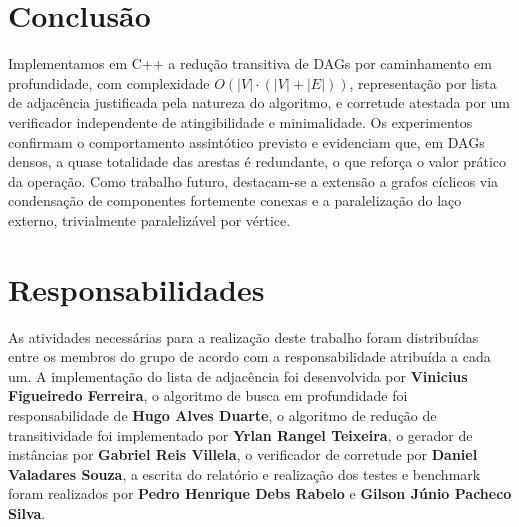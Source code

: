 \documentclass{sbc2023}%
\begin{document}
\section{Conclusão}
\label{sec:conclusao}

Implementamos em C++ a redução transitiva de DAGs por caminhamento em profundidade, com complexidade $O(|V|\cdot(|V|+|E|))$, representação por lista de adjacência justificada pela natureza do algoritmo, e corretude atestada por um verificador independente de atingibilidade e minimalidade. Os experimentos confirmam o comportamento assintótico previsto e evidenciam que, em DAGs densos, a quase totalidade das arestas é redundante, o que reforça o valor prático da operação. Como trabalho futuro, destacam-se a extensão a grafos cíclicos via condensação de componentes fortemente conexas e a paralelização do laço externo, trivialmente paralelizável por vértice.

\section{Responsabilidades}
\label{sec:resp}

As atividades necessárias para a realização deste trabalho foram distribuídas entre os membros do grupo de acordo com a responsabilidade atribuída a cada um. A implementação do lista de adjacência foi desenvolvida por \textbf{Vinicius Figueiredo Ferreira}, o algoritmo de busca em profundidade foi responsabilidade de \textbf{Hugo Alves Duarte}, o algoritmo de redução de transitividade foi implementado por \textbf{Yrlan Rangel Teixeira}, o gerador de instâncias por \textbf{Gabriel Reis Villela}, o verificador de corretude por \textbf{Daniel Valadares Souza}, a escrita do relatório e realização dos testes e benchmark foram realizados por \textbf{Pedro Henrique Debs Rabelo} e \textbf{Gilson Júnio Pacheco Silva}.



\end{document}
